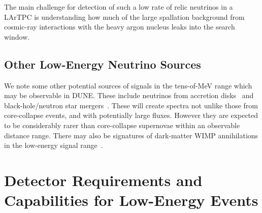  The main challenge for detection of such
a low rate of relic neutrinos in a LArTPC is understanding how much of
the large spallation background from cosmic-ray interactions with the
heavy argon nucleus 
leaks into the search window. 

\subsection{Other Low-Energy Neutrino Sources}

We note some other potential sources of signals in the tens-of-MeV range which may be observable in DUNE.  These include neutrinos from accretion disks~\cite{Caballero:2011dw} and black-hole/neutron star mergers~\cite{Caballero:2009ww}.  These will create spectra not unlike those from core-collapse events, and with potentially large fluxes.  However they are expected to be considerably rarer than core-collapse supernovae within an observable distance range.  There may also be signatures of dark-matter WIMP annihilations in the low-energy signal range~\cite{Rott:2012qb, Bernal:2012qh}.



\section{Detector Requirements and Capabilities for Low-Energy Events}
\label{sec:physics-snblowe-detector-requirements}


